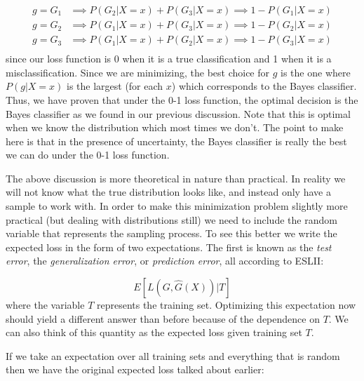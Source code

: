 \begin{equation}
\begin{split}
g=G_1 & \implies P(G_2|X=x) + P(G_3|X=x) \implies 1-P(G_1|X=x)\\
g=G_2 & \implies P(G_1|X=x) + P(G_3|X=x) \implies 1-P(G_2|X=x)\\
g=G_3 & \implies P(G_1|X=x) + P(G_2|X=x) \implies 1-P(G_3|X=x)\\
\end{split}
\end{equation}
since our loss function is 0 when it is a true classification and 1 when it is a misclassification. Since we are minimizing, the best choice for $g$ is the one where $P(g|X=x)$ is the largest (for each $x$) which corresponds to the Bayes classifier. Thus, we have proven that under the 0-1 loss function, the optimal decision is the Bayes classifier as we found in our previous discussion. Note that this is optimal when we know the distribution which most times we don't. The point to make here is that in the presence of uncertainty, the Bayes classifier is really the best we can do under the 0-1 loss function.

The above discussion is more theoretical in nature than practical. In reality we will not know what the true distribution looks like, and instead only have a sample to work with. In order to make this minimization problem slightly more practical (but dealing with distributions still) we need to include the random variable that represents the sampling process. To see this better we write the expected loss in the form of two expectations. The first is known as the \emph{test error}, the \emph{generalization error}, or \emph{prediction error}, all according to ESLII:

\begin{equation}
E[L(G, \hat{G}(X))|T]
\end{equation}
where the variable $T$ represents the training set.  Optimizing this expectation now should yield a different answer than before because of the dependence on $T$. We can also think of this quantity as the expected loss given training set $T$.

If we take an expectation over all training sets and everything that is random then we have the original expected loss talked about earlier:

